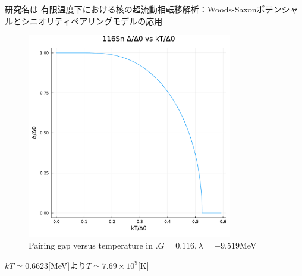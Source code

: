 \documentclass[a4paper,10pt]{jsarticle}
\begin{document}
  研究名は
  有限温度下における核の超流動相転移解析：Woods-Saxonポテンシャルとシニオリティペアリングモデルの応用
  \begin{figure}[H]
    \centering
    \includegraphics[width=0.8\textwidth]{02061.pdf}
    \caption{Pairing gap versus temperature in .$G=0.116,\lambda=-9.519$MeV}
  \end{figure}
  $kT\simeq0.6623$[MeV]より$T\simeq7.69\times 10^9$[K]
\end{document}
